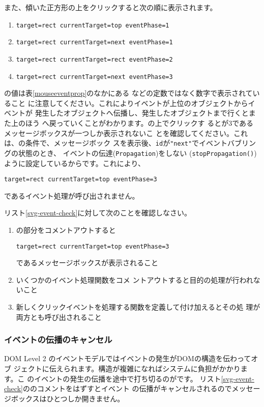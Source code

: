 また、傾いた正方形の上をクリックすると次の順に表示されます。
\begin{enumerate}
 \item \texttt{target=rect currentTarget=top eventPhase=1}
 \item \texttt{target=rect currentTarget=next eventPhase=1}
 \item \texttt{target=rect currentTarget=rect eventPhase=2}
 \item \texttt{target=rect currentTarget=next eventPhase=3}
\end{enumerate}
の値は表\ref{mouseeventprop}のなかにある
などの定数ではなく数字で表示されていること
に注意してください。これによりイベントが上位のオブジェクトからイベントが
発生したオブジェクトへ伝播し、発生したオブジェクトまで行くとまた上のほう
へ戻っていくことがわかります。の上でクリックす
るとが$3$であるメッセージボックスが一つしか表示されないこ
とを確認してください。これは、の条件で、メッセージボック
スを表示後、\texttt{id}が\texttt{"next"}でイベントバブリングの状態のとき、
イベントの伝達(\texttt{Propagation})をしない
(\texttt{stopPropagation()})ように設定しているからです。これにより、

\texttt{target=rect currentTarget=top eventPhase=3}

であるイベント処理が呼び出されません。
\begin{Problem}\upshape
リスト\ref{svg-event-check}に対して次のことを確認しなさい。
\begin{enumerate}
 \item {}の部分をコメントアウトすると

\texttt{target=rect currentTarget=top eventPhase=3}

であるメッセージボックスが表示されること
 \item いくつかのイベント処理関数をコメ
       ントアウトすると目的の処理が行われないこと
 \item 新しくクリックイベントを処理する関数を定義して付け加えるとその処
       理が両方とも呼び出されること
\end{enumerate}
\end{Problem}
\fi
\subsubsection{イベントの伝播のキャンセル}
DOM Level 2 のイベントモデルではイベントの発生がDOMの構造を伝わってオブ
ジェクトに伝えられます。構造が複雑になればシステムに負担がかかります。こ
のイベントの発生の伝播を途中で打ち切るのがです。
\iffalse
リスト\ref{svg-event-check}ののコメントをはずすとイベント
の伝播がキャンセルされるのでメッセージボックスはひとつしか開きません。

